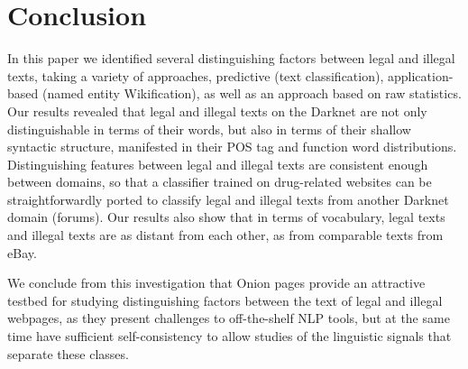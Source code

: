 \documentclass[11pt,a4paper,table]{article}
\begin{document}
\section{Conclusion} \label{sec:conclusion}

  In this paper we identified several distinguishing factors between legal and illegal texts, taking
  a variety of approaches, predictive (text classification), application-based (named entity Wikification),
  as well as an approach based on raw statistics. Our results revealed that legal and illegal texts on the Darknet
  are not only distinguishable in terms of their words, but also in terms of their shallow syntactic structure, manifested
  in their POS tag and function word distributions. Distinguishing features between legal and illegal texts are
  consistent enough between domains, so that a classifier trained on drug-related websites can be straightforwardly
  ported to classify legal and illegal texts from another Darknet domain (forums).
  Our results also show that in terms of vocabulary, legal texts and illegal texts are as distant from each other, 
  as from comparable texts from eBay.
 
  We conclude from this investigation that Onion pages provide an attractive testbed for studying distinguishing
    factors between the text of legal and illegal webpages, as they present challenges to off-the-shelf NLP tools,
    but at the same time have sufficient self-consistency to allow studies of the linguistic signals that separate these classes.




\end{document}
